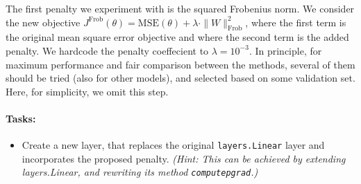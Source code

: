 \documentclass[10pt]{article}
\providecommand{\tightlist}{%
      \setlength{\itemsep}{0pt}\setlength{\parskip}{0pt}}
\begin{document}
The first penalty we experiment with is the squared Frobenius norm. We
consider the new objective
\(J^\text{Frob}(\theta) = \text{MSE}(\theta) + \lambda \cdot \|W\|_\text{Frob}^2\),
where the first term is the original mean square error objective and
where the second term is the added penalty. We hardcode the penalty
coeffecient to \(\lambda = 10^{-3}\). In principle, for maximum
performance and fair comparison between the methods, several of them
should be tried (also for other models), and selected based on some
validation set. Here, for simplicity, we omit this step.

\paragraph{Tasks:}\label{tasks}

\begin{itemize}
\tightlist
\item
  Create a new layer, that replaces the original \texttt{layers.Linear}
  layer and incorporates the proposed penalty. \emph{(Hint: This can be
  achieved by extending layers.Linear, and rewriting its method
  \texttt{computepgrad}.)}
\end{itemize}
\end{document}
